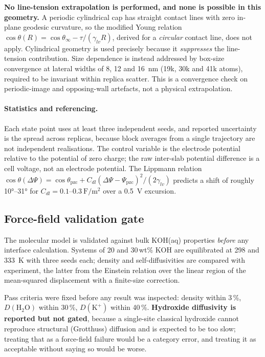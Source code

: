 \documentclass[11pt,a4paper]{article}
\begin{document}
\textbf{No line-tension extrapolation is performed, and none is possible in this geometry.} A
periodic cylindrical cap has straight contact lines with zero in-plane geodesic curvature, so the
modified Young relation $\cos\theta(R)=\cos\theta_\infty - \tau/(\gamma_{lv}R)$, derived for a
\emph{circular} contact line, does not apply. Cylindrical geometry is used precisely because it
\emph{suppresses} the line-tension contribution. Size dependence is instead addressed by box-size
convergence at lateral widths of 8, 12 and \SI{16}{\nano\metre} (19k, 30k and 41k atoms), required to
be invariant within replica scatter. This is a convergence check on periodic-image and opposing-wall
artefacts, not a physical extrapolation.

\paragraph{Statistics and referencing.} Each state point uses at least three independent seeds, and
reported uncertainty is the spread across replicas, because block averages from a single trajectory
are not independent realisations. The control variable is the electrode potential relative to the
potential of zero charge; the raw inter-slab potential difference is a cell voltage, not an electrode
potential. The Lippmann relation
$\cos\theta(\Delta\Psi)=\cos\theta_{\mathrm{pzc}} + C_{dl}(\Delta\Psi-\Psi_{\mathrm{pzc}})^2/(2\gamma_{lv})$
predicts a shift of roughly \ang{10}--\ang{31} for $C_{dl}=0.1$--$\SI{0.3}{\farad\per\square\metre}$
over a \SI{0.5}{\volt} excursion.

\subsection{Force-field validation gate}\label{sec:ffgate}
The molecular model is validated against bulk KOH(aq) properties \emph{before} any interface
calculation. Systems of 20 and 30\,wt\% KOH are equilibrated at 298 and \SI{333}{\kelvin} with three
seeds each; density and self-diffusivities are compared with experiment, the latter from the Einstein
relation over the linear region of the mean-squared displacement with a finite-size correction.

Pass criteria were fixed before any result was inspected: density within 3\,\%, $D(\mathrm{H_2O})$
within 30\,\%, $D(\mathrm{K^+})$ within 40\,\%. \textbf{Hydroxide diffusivity is reported but not
gated}, because a single-site classical hydroxide cannot reproduce structural (Grotthuss) diffusion
and is expected to be too slow; treating that as a force-field failure would be a category error, and
treating it as acceptable without saying so would be worse.
\end{document}
